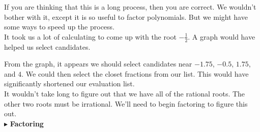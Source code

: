 \documentclass{ximera}
\begin{document}
If you are thinking that this is a long process, then you are correct.  We wouldn't bother with it, except it is so useful to factor polynomials.  But we might have some ways to speed up the process.  \\

It took us a lot of calculating to come up with the root $-\frac{1}{2}$.  A graph would have helped us select candidates.


\begin{center}
\end{center}


From the graph, it appears we should select candidates near $-1.75$, $-0.5$, $1.75$, and $4$. We could then select the closet fractions from our list. This would have significantly shortened our evaluation list.  \\

It wouldn't take long to figure out that we have all of the rational roots. The other two roots must be irrational.  We'll need to begin factoring to figure this out. \\



$\blacktriangleright$ \textbf{Factoring}
\end{document}
